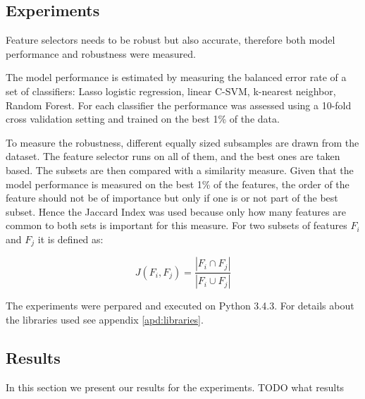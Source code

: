 \documentclass[twoside,11pt]{article}
\begin{document}
\subsection{Experiments}
\label{sec:experiments}

Feature selectors needs to be robust but also accurate, therefore both model performance and robustness were measured.

The model performance is estimated by measuring the balanced error rate of a set of classifiers: Lasso logistic regression, linear C-SVM, k-nearest neighbor, Random Forest. 
For each classifier the performance was assessed using a 10-fold cross validation setting and trained on the best 1\% of the data.

To measure the robustness, different equally sized subsamples are drawn from the dataset. The feature selector runs on all of them, and the best ones are taken based. The subsets are then compared with a similarity measure. Given that the model performance is measured on the best 1\% of the features, the order of the feature should not be of importance but only if one is or not part of the best subset. Hence the Jaccard Index was used because only how many features are common to both sets is important for this measure. For two subsets of features $F_i$ and $F_j$ it is defined as:

\begin{equation}
J(F_i, F_j) = \frac{| F_i \cap F_j |}{| F_i \cup F_j |}
\end{equation}

The experiments were perpared and executed on Python 3.4.3. For details about the libraries used see appendix \ref{apd:libraries}.

\subsection{Results}
In this section we present our results for the experiments. TODO what results
\end{document}
